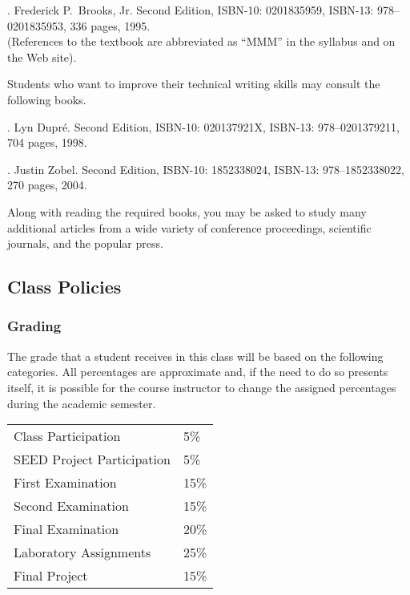\documentclass[11pt]{article}
\begin{document}
. Frederick P.\ Brooks, Jr.
Second Edition, ISBN-10: 0201835959, ISBN-13: 978--0201835953, 336 pages, 1995. \\
(References to the textbook are abbreviated as ``MMM'' in the syllabus and on the Web site).

\noindent
Students who want to improve their technical writing skills may consult the following books.

. Lyn Dupr\'e. Second Edition,  ISBN-10: 020137921X,
ISBN-13: 978--0201379211, 704 pages, 1998.

. Justin Zobel. Second Edition, ISBN-10: 1852338024, ISBN-13:
978--1852338022, 270 pages, 2004.

\noindent
Along with reading the required books, you may be asked to study many additional articles from a wide variety of
conference proceedings, scientific journals, and the popular press.

\subsection*{Class Policies}

\subsubsection*{Grading}

The grade that a student receives in this class will be based on the following categories. All percentages are
approximate and, if the need to do so presents itself, it is possible for the course instructor to change the assigned
percentages during the academic semester.

\begin{center}
  \begin{tabular}{ll}
    Class Participation        & 5\%  \\
    SEED Project Participation & 5\%  \\
    First Examination          & 15\% \\
    Second Examination         & 15\% \\
    Final Examination          & 20\% \\
    Laboratory Assignments     & 25\% \\
    Final Project              & 15\%
  \end{tabular}
\end{center}
\end{document}
